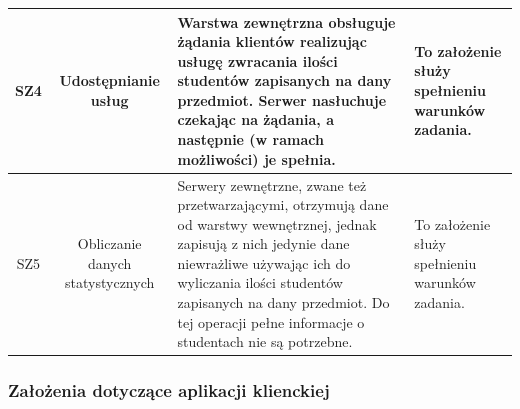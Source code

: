 \begin{center}
\begin{tabular}{|c|c|l|l|}
\hline
\label{z:sz4} SZ4 & Udostępnianie usług & Warstwa zewnętrzna obsługuje żądania klientów realizując usługę zwracania ilości studentów zapisanych na dany przedmiot. Serwer nasłuchuje czekając na żądania, a następnie (w ramach możliwości) je spełnia. & To założenie służy spełnieniu warunków zadania. \\
\hline
\label{z:sz5} SZ5 & Obliczanie danych statystycznych &  Serwery zewnętrzne, zwane też przetwarzającymi, otrzymują dane od warstwy wewnętrznej, jednak zapisują z nich jedynie dane niewrażliwe używając ich do wyliczania ilości studentów zapisanych na dany przedmiot. Do tej operacji pełne informacje o studentach nie są potrzebne. & 
To założenie służy spełnieniu warunków zadania. \\
\hline
\end{tabular} 

\subsubsection*[Założenia dotyczące aplikacji klienckiej]{Założenia dotyczące aplikacji klienckiej} \label{z:k}


\end{center}
